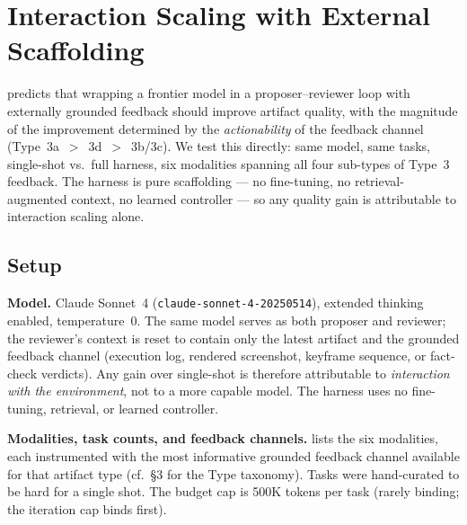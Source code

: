 
\section{Interaction Scaling with External Scaffolding}
\label{sec:harness}

 predicts that wrapping a frontier model in a proposer--reviewer loop with externally grounded feedback should improve artifact quality, with the magnitude of the improvement determined by the \emph{actionability} of the feedback channel (Type~3a~$>$~3d~$>$~3b/3c). We test this directly: same model, same tasks, single-shot vs.\ full harness, six modalities spanning all four sub-types of Type~3 feedback. The harness is pure scaffolding --- no fine-tuning, no retrieval-augmented context, no learned controller --- so any quality gain is attributable to interaction scaling alone.

\subsection{Setup}
\label{sec:harness-setup}

\textbf{Model.} Claude Sonnet~4 (\texttt{claude-sonnet-4-20250514}), extended thinking enabled, temperature~$0$. The same model serves as both proposer and reviewer; the reviewer's context is reset to contain only the latest artifact and the grounded feedback channel (execution log, rendered screenshot, keyframe sequence, or fact-check verdicts). Any gain over single-shot is therefore attributable to \emph{interaction with the environment}, not to a more capable model. The harness uses no fine-tuning, retrieval, or learned controller.

\textbf{Modalities, task counts, and feedback channels.}
 lists the six modalities, each instrumented with the most informative grounded feedback channel available for that artifact type (cf.\ \S{}3 for the Type taxonomy). Tasks were hand-curated to be hard for a single shot. The budget cap is 500K tokens per task (rarely binding; the iteration cap binds first).

